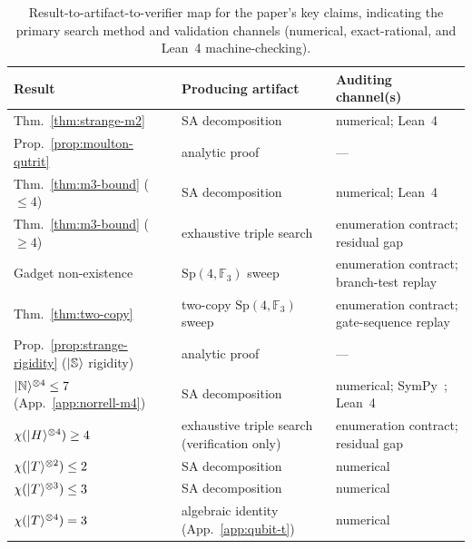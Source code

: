 \documentclass[11pt]{article}
\theoremstyle{definition}
\newcommand{\microspace}{\mspace{0.5mu}}
\newcommand{\ket}[1]{\lvert\microspace #1 \microspace \rangle}
\newcommand{\F}{\mathcal{F}}
\renewcommand{\F}[1]{\mathbb{F}_{#1}}
\newcommand{\chiR}{\chi}
\newcommand{\Strange}{\ket{\mathbb{S}}}
\newcommand{\Norrell}{\ket{\mathbb{N}}}
\newcommand{\Sp}{\mathrm{Sp}}
\begin{document}
	\begin{table}[!htbp]
		\centering
		\small
		\begin{tabular}{l l l}
			\toprule
			Result & Producing artifact & Auditing channel(s) \\
			\midrule
			Thm.~\ref{thm:strange-m2}        & SA decomposition          & numerical; Lean~4 \\
			Prop.~\ref{prop:moulton-qutrit}  & analytic proof            & --- \\
			Thm.~\ref{thm:m3-bound} ($\le 4$) & SA decomposition         & numerical; Lean~4 \\
			Thm.~\ref{thm:m3-bound} ($\ge 4$) & exhaustive triple search & enumeration contract; residual gap \\
			Gadget non-existence & $\Sp(4, \F{3})$ sweep & enumeration contract; branch-test replay \\
			Thm.~\ref{thm:two-copy} & two-copy $\Sp(4, \F{3})$ sweep & enumeration contract; gate-sequence replay \\
			Prop.~\ref{prop:strange-rigidity} ($\Strange$ rigidity) & analytic proof & --- \\
			$\Norrell^{\otimes 4} \le 7$ (App.~\ref{app:norrell-m4}) & SA decomposition & numerical; SymPy~\cite{meurer2017sympy}; Lean~4 \\
			\midrule
			$\chiR(\ket{H}^{\otimes 4}) \ge 4$~\cite{bravyi2016trading}  & exhaustive triple search (verification only) & enumeration contract; residual gap \\
			$\chiR(\ket{T}^{\otimes 2}) \le 2$  & SA decomposition & numerical \\
			$\chiR(\ket{T}^{\otimes 3}) \le 3$  & SA decomposition & numerical \\
			$\chiR(\ket{T}^{\otimes 4}) = 3$  & algebraic identity (App.~\ref{app:qubit-t}) & numerical \\
			\bottomrule
		\end{tabular}
		\caption{Result-to-artifact-to-verifier map for the paper's key claims, indicating the primary search method and validation channels (numerical, exact-rational, and Lean~4 machine-checking).}
		\label{tab:claims}
	\end{table}
	
\end{document}
